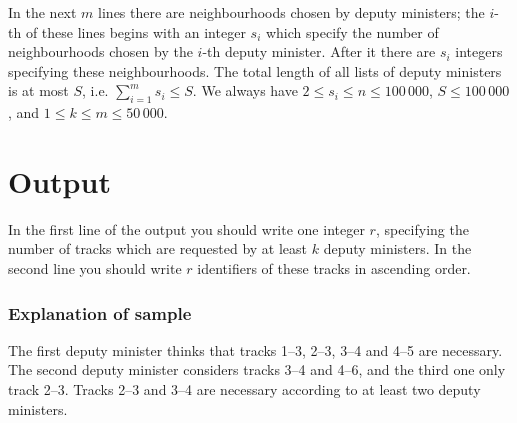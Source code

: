 In the next $m$ lines there are neighbourhoods chosen by deputy ministers; the $i$-th of these lines begins with an integer $s_i$ which specify the number of neighbourhoods chosen by the $i$-th deputy minister. After it there are $s_i$ integers specifying these neighbourhoods. The total length of all lists of deputy ministers is at most $S$, i.e. $\sum_{i=1}^{m}s_i \leq S$.
%
We always have $2 \leq s_i \leq n \leq 100\,000$, $S \leq 100\,000$, and $1 \leq k \leq m \leq 50\,000$. 
%


\section*{Output}
In the first line of the output you should write one integer $r$, specifying the number of tracks which are requested by at least $k$ deputy ministers. In the second line you should write $r$ identifiers of these tracks in ascending order.

\subsubsection*{Explanation of sample}

\noindent
The first deputy minister thinks that tracks 1–3, 2–3, 3–4 and 4–5 are necessary. The second deputy minister considers tracks 3–4 and 4–6, and the third one only track 2–3. Tracks
2–3 and 3–4 are necessary according to at least two deputy ministers.

